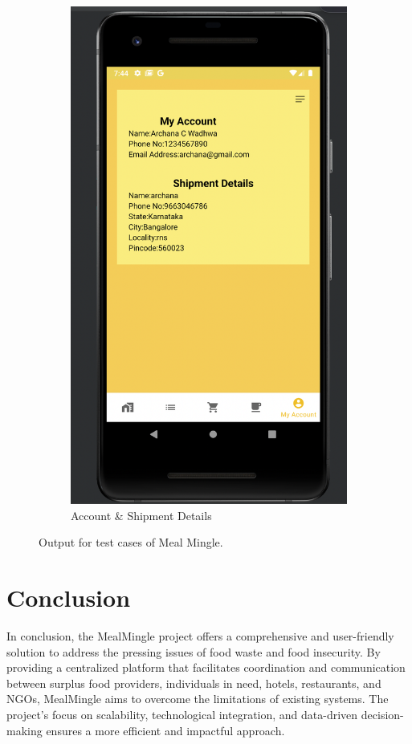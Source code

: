 \begin{figure}[H]
\begin{subfigure}[b]{0.3\textwidth}
         \includegraphics[width=\textwidth]{m6}
         \caption{Account \& Shipment Details }
         \label{third disp}
     \end{subfigure}
        \vspace{10pt}
        \caption{ Output for test cases of Meal Mingle.}
        \label{fig3}
\end{figure}

\chapter{Conclusion}
 In conclusion, the MealMingle project offers a comprehensive and user-friendly solution to address the pressing issues of food waste and food insecurity. By providing a centralized platform that facilitates coordination and communication between surplus food providers, individuals in need, hotels, restaurants, and NGOs, MealMingle aims to overcome the limitations of existing systems. The project's focus on scalability, technological integration, and data-driven decision-making ensures a more efficient and impactful approach.

